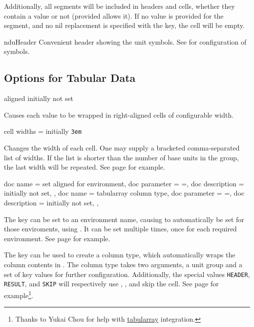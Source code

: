 \documentclass[
	a4paper,
	margin=4cm
]{article}
\begin{document}
Additionally, all segments will be included in headers and cells, whether they contain a value or not (provided  allows it). If no value is provided for the segment, and no nil replacement is specified with the  key, the cell will be empty.

\begin{docCommand}
	{nduHeader}
	{}
	Convenient header showing the unit symbols. See  for configuration of symbols.
\end{docCommand}

\subsection{Options for Tabular Data}

\begin{docKey}
	{aligned}
	{}
	{initially not set}

Causes each value to be wrapped in right-aligned cells of configurable width.
\end{docKey}

\begin{docKey}
	{cell widths}
	{=}
	{initially \texttt{3em}}

Changes the width of each cell. One may supply a bracketed comma-separated list of widths. If the list is shorter than the number of base units in the group, the last width will be repeated. See page \pageref{example:table:widths} for example.
\end{docKey}

\begin{docKeys}
	[]
	{
		{
			doc name = set aligned for environment,
			doc parameter = {=},
			doc description = {initially not set},
		},
		{
			doc name = tabularray column type,
			doc parameter = {=},
			doc description = {initially not set},
		},
	}

	The  key can be set to an environment name, causing  to automatically be set for those enviroments, using . It can be set multiple times, once for each required environment. See page \pageref{example:table:environment} for example.

	The  key can be used to create a column type, which automatically wraps the column contents in . The column type takes two arguments, a unit group and a set of key values for further configuration. Additionally, the special values \texttt{HEADER},  \texttt{RESULT}, and \texttt{SKIP} will respectively use , , and skip the cell. See page \pageref{example:table:tabularray} for example\footnote{Thanks to Yukai Chou for help with \href{https://github.com/lvjr/tabularray}{tabularray} integration.}.

\end{docKeys}
\end{document}
